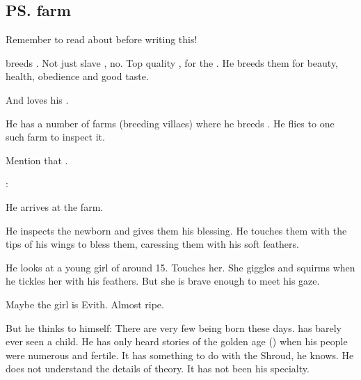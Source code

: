 \subsection{\ps{\Teshrial} farm}
Remember to read about  before writing this! 

\Teshrial{} breeds \humans. 
Not just slave \humans, no. 
Top quality \humans{}, for the . 
He breeds them for beauty, health, obedience and good taste. 


And \Teshrial{} loves his \humans. 

He has a number of farms (breeding villaes) where he breeds \humans. 
He flies to one such farm to inspect it. 

Mention that . 

\begin{prose}
\Teshrial: 
\end{prose}

He arrives at the farm. 

He inspects the newborn and gives them his blessing. 
He touches them with the tips of his wings to bless them, caressing them with his soft feathers. 

He looks at a young girl of around 15. 
Touches her. 
She giggles and squirms when he tickles her with his feathers. 
But she is brave enough to meet his gaze. 


Maybe the girl is Evith. 
Almost ripe. 


But he thinks to himself: 
There are very few \resphain{} being born these days. 
\Teshrial{} has barely ever seen a \resphan{} child. 
He has only heard stories of the golden age () when his people were numerous and fertile. 
It has something to do with the Shroud, he knows. 
He does not understand the details of \dweomer{} theory. 
It has not been his specialty. 

